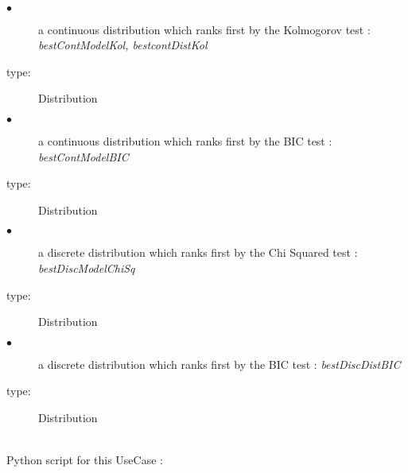 \textspace\\

             {
               \begin{description}
               \item[$\bullet$] a continuous distribution which ranks first by the Kolmogorov test  : {\itshape bestContModelKol, bestcontDistKol}
               \item[type:] Distribution
               \item[$\bullet$] a continuous distribution which ranks first by the BIC test  : {\itshape bestContModelBIC}
               \item[type:] Distribution
               \item[$\bullet$] a discrete distribution which ranks first by the Chi Squared test  : {\itshape bestDiscModelChiSq}
               \item[type:] Distribution
               \item[$\bullet$] a discrete distribution which ranks first by the BIC  test  : {\itshape bestDiscDistBIC}
               \item[type:] Distribution
               \end{description}
             }

             \textspace\\
             Python script for this UseCase :

